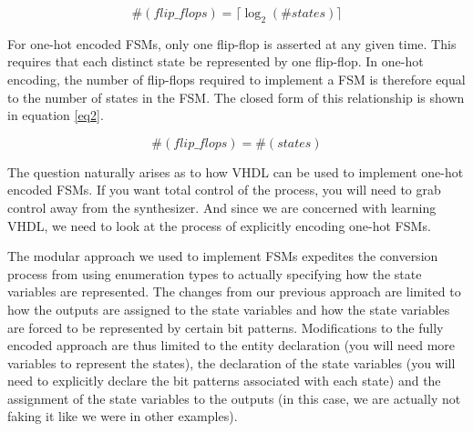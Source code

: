 \begin{equation}\label{eq1}
 \#(flip\_flops) = \lceil \log_2(\#states) \rceil
\end{equation}

For one-hot encoded FSMs, only one flip-flop is asserted at any given time. This requires that each distinct state be represented by one flip-flop. In one-hot encoding, the number of flip-flops required to implement a FSM is therefore equal to the number of states in the FSM. The closed form of this relationship is shown in equation \ref{eq2}.

\begin{equation}\label{eq2}
 \#(flip\_flops) = \#(states)
\end{equation}

The question naturally arises as to how VHDL can be used to implement one-hot encoded FSMs. If you want total control of the process, you will need to grab control away from the synthesizer. And since we are concerned with learning VHDL, we need to look at the process of explicitly encoding one-hot FSMs.

The modular approach we used to implement FSMs expedites the conversion process from using enumeration types to actually specifying how the state variables are represented. The changes from our previous approach are limited to how the outputs are assigned to the state variables and how the state variables are forced to be represented by certain bit patterns. Modifications to the fully encoded approach are thus limited to the entity declaration (you will need more variables to represent the states), the declaration of the state variables (you will need to explicitly declare the bit patterns associated with each state) and the assignment of the state variables to the outputs (in this case, we are actually not faking it like we were in other examples).

